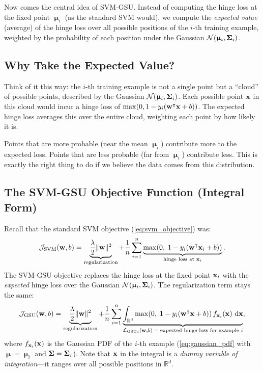 \documentclass[11pt, letterpaper]{article}
\newcommand{\bSigma}{\vb{\Sigma}}
\newcommand{\bmu}{\boldsymbol{\upmu}}
\newcommand{\R}{\mathbb{R}}
\newcommand{\loss}{\mathcal{L}}
\newcommand{\obj}{\mathcal{J}}
\newcommand{\Norm}{\mathcal{N}}
\begin{document}
Now comes the central idea of SVM-GSU. Instead of computing the hinge loss at the fixed point $\bmu_i$ (as the standard SVM would), we compute the \emph{expected value} (average) of the hinge loss over all possible positions of the $i$-th training example, weighted by the probability of each position under the Gaussian $\Norm(\bmu_i, \bSigma_i)$.

\subsection{Why Take the Expected Value?}

Think of it this way: the $i$-th training example is not a single point but a ``cloud'' of possible points, described by the Gaussian $\Norm(\bmu_i, \bSigma_i)$. Each possible point $\vb{x}$ in this cloud would incur a hinge loss of $\max(0, 1 - y_i(\vb{w}^{\intercal} \vb{x} + b))$. The expected hinge loss averages this over the entire cloud, weighting each point by how likely it is.

Points that are more probable (near the mean $\bmu_i$) contribute more to the expected loss. Points that are less probable (far from $\bmu_i$) contribute less. This is exactly the right thing to do if we believe the data comes from this distribution.

\subsection{The SVM-GSU Objective Function (Integral Form)}

Recall that the standard SVM objective (\cref{eq:svm_objective}) was:
\begin{equation*}
    \obj_{\text{SVM}}(\vb{w}, b) = \underbrace{\frac{\lambda}{2}\|\vb{w}\|^2}_{\text{regularization}} + \frac{1}{n}\sum_{i=1}^{n} \underbrace{\max\!\left(0,\; 1 - y_i\!\left(\vb{w}^{\intercal} \vb{x}_i + b\right)\right)}_{\text{hinge loss at } \vb{x}_i}.
\end{equation*}
The SVM-GSU objective replaces the hinge loss at the fixed point $\vb{x}_i$ with the \emph{expected} hinge loss over the Gaussian $\Norm(\bmu_i, \bSigma_i)$. The regularization term stays the same:
\begin{equation}\label{eq:gsu_objective}
    \obj_{\text{GSU}} (\vb{w}, b) = \underbrace{\frac{\lambda}{2}\|\vb{w}\|^2}_{\text{regularization}} + \frac{1}{n}\sum_{i=1}^{n} \underbrace{\int_{\R^d} \max\!\left(0,\; 1 - y_i\!\left(\vb{w}^{\intercal} \vb{x} + b\right)\right) f_{\vb{x}_i}(\vb{x})\, \dd{\vb{x}}}_{{\loss_{\text{GSU}}}_{i}(\vb{w}, b) \;=\; \text{expected hinge loss for example } i},
\end{equation}
where $f_{\vb{x}_i}(\vb{x})$ is the Gaussian PDF of the $i$-th example (\cref{eq:gaussian_pdf} with $\bmu = \bmu_i$ and $\bSigma = \bSigma_i$). Note that $\vb{x}$ in the integral is a \emph{dummy variable of integration}---it ranges over all possible positions in $\R^d$.
\end{document}
